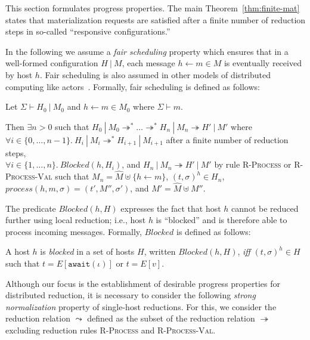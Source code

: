 This section formulates progress properties. The main
Theorem~\ref{thm:finite-mat} states that materialization requests are
satisfied after a finite number of reduction steps in so-called
``responsive configurations.''

In the following we assume a {\em fair scheduling} property which
ensures that in a well-formed configuration $H~|~M$, each message $h
\leftarrow m \in M$ is eventually received by host $h$. Fair
scheduling is also assumed in other models of distributed computing
like actors~\cite{Actors,Talcott}. Formally, fair scheduling is
defined as follows:

\begin{defn}\label{def:fair-scheduling}
  Let $\Sigma \vdash H_0~|~M_0$ and $h \leftarrow m \in M_0$ where
  $\Sigma \vdash m$.

  Then $\exists n > 0$ such that $H_0~|~M_0 \twoheadrightarrow^*
  \ldots \twoheadrightarrow^* H_n~|~M_n \twoheadrightarrow H'~|~M'$
  where \\$\forall i \in \{ 0, \ldots, n-1 \}.~H_i~|~M_i
  \twoheadrightarrow^* H_{i+1}~|~M_{i+1}$ after a finite number of
  reduction steps, \\$\forall i \in \{ 1, \ldots, n
  \}.~\mathit{Blocked}(h, H_i)$, and $H_n~|~M_n \twoheadrightarrow
  H'~|~M'$ by rule \textsc{R-Process} or \textsc{R-Process-Val} such
  that $M_n = \hat{M} \uplus \{ h \leftarrow m \}$, $(t, \sigma)^h \in
  H_n$, $process(h, m, \sigma) = (t', M'', \sigma')$, and $M' =
  \hat{M} \uplus M''$.
\end{defn}

The predicate $\mathit{Blocked}(h, H)$ expresses the fact that host
$h$ cannot be reduced further using local reduction; i.e., host $h$ is
``blocked'' and is therefore able to process incoming
messages. Formally, $\mathit{Blocked}$ is defined as follows:

\begin{defn}\label{def:blocked-host}
  A host $h$ is {\em blocked} in a set of hosts $H$, written
  $\mathit{Blocked}(h, H)$, {\em iff} $(t, \sigma)^h \in H$ such that
  $t = E[\texttt{await}(\iota)]$ or $t = E[v]$.
\end{defn}

Although our focus is the establishment of desirable progress
properties for distributed reduction, it is necessary to consider the
following {\em strong normalization} property of single-host
reductions. For this, we consider the reduction relation $\leadsto$
defined as the subset of the reduction relation $\twoheadrightarrow$
excluding reduction rules \textsc{R-Process} and
\textsc{R-Process-Val}.

